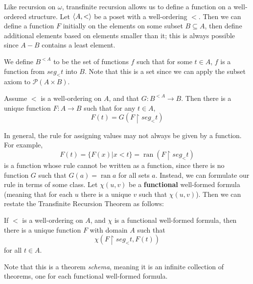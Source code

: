 Like recursion on $\omega$, transfinite recursion allows us to define a function on a well-ordered structure. Let $\left\langle A,< \right\rangle$ be a poset with a well-ordering $<$. Then we can define a function $F$ initially on the elements on some subset $B \subseteq A$, then define additional elements based on elements smaller than it; this is always possible since $A - B$ contains a least element. 

We define $B^{< A}$ to be the set of functions $f$ such that for some $t \in A$, $f$ is a function from $seg_<t$ into $B$. Note that this is a set since we can apply the subset axiom to $\mathcal{P}(A \times B)$. 

\begin{theorem}
    Assume $<$ is a well-ordering on $A$, and that $G: B^{< A} \to B$. Then there is a unique function $F: A \to B$ such that for any $t \in A$, 
    \[F(t) = G(F \upharpoonright seg_<t)\]
\end{theorem}

In general, the rule for assigning values may not always be given by a function. For example, 
\[F(t) = \{F(x) | x < t\} = \operatorname{ran}(F \upharpoonright seg_<t)\]
is a function whose rule cannot be written as a function, since there is no function $G$ such that $G(a) = \operatorname{ran}a$ for all sets $a$. Instead, we can formulate our rule in terms of some class. Let $\chi(u,v)$ be a \textbf{functional} well-formed formula (meaning that for each $u$ there is a unique $v$ such that $\chi(u,v)$). Then we can restate the Transfinite Recursion Theorem as follows:

\begin{theorem}
    If $<$ is a well-ordering on $A$, and $\chi$ is a functional well-formed formula, then there is a unique function $F$ with domain $A$ such that 
    \[\chi(F \upharpoonright seg_<t, F(t))\]
    for all $t \in A$. 
\end{theorem}

Note that this is a theorem \textit{schema}, meaning it is an infinite collection of theorems, one for each functional well-formed formula. 